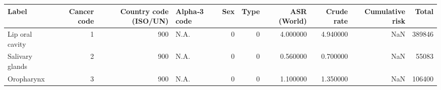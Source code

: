 \begin{tabular}{lrrlrrrrrr}
\toprule
Label & Cancer code & Country code (ISO/UN) & Alpha‑3 code & Sex & Type & ASR (World) & Crude rate & Cumulative risk & Total \\
\midrule
Lip oral cavity & 1 & 900 & N.A. & 0 & 0 & 4.000000 & 4.940000 & NaN & 389846 \\
Salivary glands & 2 & 900 & N.A. & 0 & 0 & 0.560000 & 0.700000 & NaN & 55083 \\
Oropharynx & 3 & 900 & N.A. & 0 & 0 & 1.100000 & 1.350000 & NaN & 106400 \\
\bottomrule
\end{tabular}
